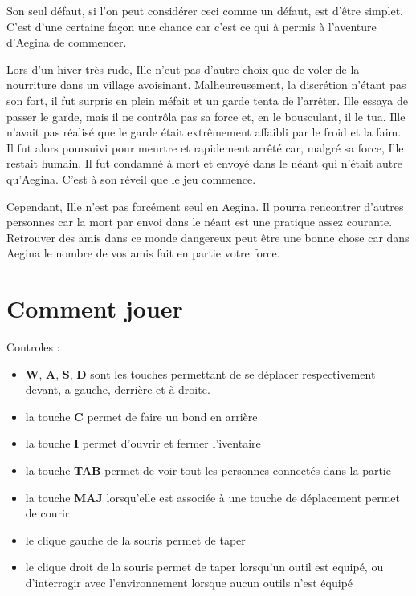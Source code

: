 \documentclass[12pt,a4paper]{article}
\begin{document}
Son seul défaut, si l'on peut  considérer ceci comme un défaut, est d'être simplet. C'est d'une certaine façon une chance car c'est ce  qui à permis à l'aventure d'Aegina de commencer. 

Lors d'un hiver très rude, Ille n'eut pas d'autre choix que de voler de la nourriture dans un village avoisinant. Malheureusement, la discrétion n'étant pas son fort, il fut surpris en plein méfait et un garde tenta de l'arrêter. Ille essaya de passer le garde, mais il ne contrôla pas sa force et, en le bousculant, il le tua. Ille n'avait pas réalisé que le garde  était  extrêmement affaibli par le froid et la faim. Il fut alors poursuivi pour meurtre et rapidement arrêté car, malgré sa force, Ille restait humain. Il fut condamné à  mort et envoyé dans le néant qui n'était autre qu'Aegina. C'est à son réveil que le jeu commence.

Cependant, Ille n'est pas forcément seul en Aegina. Il pourra rencontrer d'autres personnes car la mort par envoi dans le néant est une pratique assez courante. Retrouver des amis dans ce monde dangereux peut être une bonne chose car dans Aegina le nombre de vos amis fait en partie votre force.


\pagebreak

\section{Comment jouer}
Controles : 
\begin{itemize}
\item \textbf{W}, \textbf{A}, \textbf{S}, \textbf{D} sont les touches permettant de se déplacer respectivement devant, a gauche, derrière et à droite.
\item la touche \textbf{C} permet de faire un bond en arrière
\item la touche \textbf{I} permet d'ouvrir et fermer l'iventaire
\item la touche \textbf{TAB} permet de voir tout les personnes connectés dans la partie 
\item la touche \textbf{MAJ} lorsqu'elle est associée à une touche de déplacement permet de courir 
\item le clique gauche de la souris permet de taper
\item le clique droit de la souris permet de taper lorsqu'un outil est equipé, ou d'interragir avec l'environnement lorsque aucun outils n'est équipé 

\end{itemize}
\end{document}
